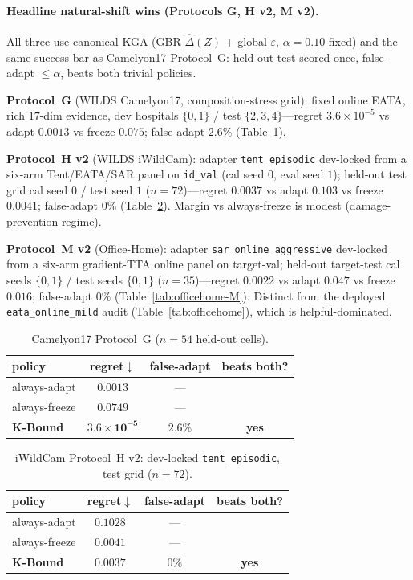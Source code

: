 \documentclass[conference]{IEEEtran}
\theoremstyle{plain}
\theoremstyle{definition}
\begin{document}
\paragraph{Headline natural-shift wins (Protocols G, H v2, M v2).}
All three use canonical \textsc{KGA} (GBR $\widehat\Delta(Z)$ + global $\varepsilon$,
$\alpha{=}0.10$ fixed) and the same success bar as Camelyon17 Protocol~G: held-out test
scored once, false-adapt $\le\alpha$, beats both trivial policies.

\textbf{Protocol~G} (WILDS Camelyon17, composition-stress grid): fixed online EATA,
rich $17$-dim evidence, dev hospitals $\{0,1\}$ / test $\{2,3,4\}$---regret
$3.6{\times}10^{-5}$ vs adapt $0.0013$ vs freeze $0.075$; false-adapt $2.6\%$
(Table~\ref{tab:camelyon17-G}).

\textbf{Protocol~H v2} (WILDS iWildCam): adapter \texttt{tent\_episodic} dev-locked from a
six-arm Tent/EATA/SAR panel on \texttt{id\_val} (cal seed $0$, eval seed $1$); held-out
test grid cal seed $0$ / test seed $1$ ($n{=}72$)---regret $0.0037$ vs adapt $0.103$ vs
freeze $0.0041$; false-adapt $0\%$ (Table~\ref{tab:iwildcam-H}). Margin vs always-freeze
is modest (damage-prevention regime).

\textbf{Protocol~M v2} (Office-Home): adapter \texttt{sar\_online\_aggressive} dev-locked
from a six-arm gradient-TTA online panel on target-val; held-out target-test cal seeds
$\{0,1\}$ / test seeds $\{0,1\}$ ($n{=}35$)---regret $0.0022$ vs adapt $0.047$ vs freeze
$0.016$; false-adapt $0\%$ (Table~\ref{tab:officehome-M}). Distinct from the deployed
\texttt{eata\_online\_mild} audit (Table~\ref{tab:officehome}), which is helpful-dominated.

\begin{table}[t]\centering\small
\caption{Camelyon17 Protocol~G ($n{=}54$ held-out cells).}
\label{tab:camelyon17-G}
\begin{tabular}{lccc}
\toprule
policy & regret$\downarrow$ & false-adapt & beats both? \\
\midrule
always-adapt  & $0.0013$ & --- & \\
always-freeze & $0.0749$ & --- & \\
\textbf{K-Bound} & $\mathbf{3.6{\times}10^{-5}}$ & $2.6\%$ & \textbf{yes} \\
\bottomrule
\end{tabular}
\end{table}

\begin{table}[t]\centering\small
\caption{iWildCam Protocol~H v2: dev-locked \texttt{tent\_episodic}, test grid ($n{=}72$).}
\label{tab:iwildcam-H}
\begin{tabular}{lccc}
\toprule
policy & regret$\downarrow$ & false-adapt & beats both? \\
\midrule
always-adapt  & $0.1028$ & --- & \\
always-freeze & $0.0041$ & --- & \\
\textbf{K-Bound} & $\mathbf{0.0037}$ & $0\%$ & \textbf{yes} \\
\bottomrule
\end{tabular}
\end{table}
\end{document}
